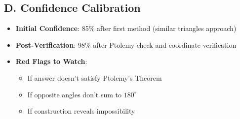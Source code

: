 \documentclass[12pt]{article}
\begin{document}
\begin{verificationbox}
\subsection*{D. Confidence Calibration}
\begin{itemize}[leftmargin=*]
    \item \textbf{Initial Confidence}: 85\% after first method (similar triangles approach)
    \item \textbf{Post-Verification}: 98\% after Ptolemy check and coordinate verification
    \item \textbf{Red Flags to Watch}: 
    \begin{itemize}
        \item If answer doesn't satisfy Ptolemy's Theorem
        \item If opposite angles don't sum to $180^\circ$
        \item If construction reveals impossibility
    \end{itemize}
\end{itemize}
\end{verificationbox}
\end{document}

